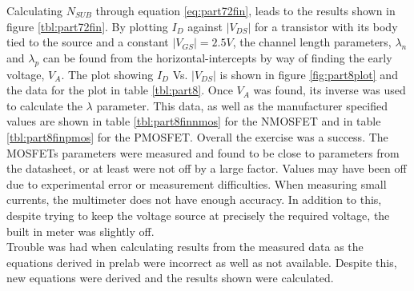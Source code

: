 Calculating $N_{SUB}$ through equation \ref{eq:part72fin}, leads to the results shown in figure \ref{tbl:part72fin}.
By plotting $I_D$ against $|V_{DS}|$ for a transistor with its body tied to the source and a constant $|V_{GS}| = 2.5V$, the channel length parameters, $\lambda_n$ and $\lambda_p$ can be found from the horizontal-intercepts by way of finding the early voltage, $V_A$.
The plot showing $I_D$ Vs. $|V_{DS}|$ is shown in figure \ref{fig:part8plot} and the data for the plot in table \ref{tbl:part8}. 
Once $V_A$ was found, its inverse was used to calculate the $\lambda$ parameter. This data, as well as the manufacturer specified values are shown in table \ref{tbl:part8finnmos} for the NMOSFET and in table \ref{tbl:part8finpmos} for the PMOSFET. 
Overall the exercise was a success. The MOSFETs parameters were measured and found to be close to parameters from the datasheet, or at least were not off by a large factor. 
Values may have been off due to experimental error or measurement difficulties. When measuring small currents, the multimeter does not have enough accuracy. In addition to this, despite trying to keep the voltage source at precisely the required voltage, the built in meter was slightly off. \\
Trouble was had when calculating results from the measured data as the equations derived in prelab were incorrect as well as not available. Despite this, new equations were derived and the results shown were calculated. 





